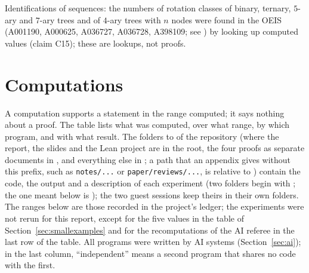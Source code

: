 \documentclass[11pt]{article}
\theoremstyle{definition}
\theoremstyle{remark}
\numberwithin{equation}{section}
\numberwithin{figure}{section}
\begin{document}
\noindent Identifications of sequences: the numbers of rotation classes of binary, ternary, $5$-ary and
$7$-ary trees and of $4$-ary trees with $n$ nodes were found in the OEIS (A001190, A000625, A036727, A036728,
A398109; see \cite{OEISmobiles,OEISA000625}) by looking up computed values (claim C15); these are lookups, not proofs.


\section{Computations}\label{sec:computations}
A computation supports a statement in the range computed; it says nothing about a proof. The table lists
what was computed, over what range, by which program, and with what result. The folders
 to  of the repository
(where the report, the slides and the Lean project are in the root, the four proofs as separate documents in
, and everything else in ; a path that an appendix gives
without this prefix, such as \texttt{notes/...} or \texttt{paper/reviews/...}, is relative to
) contain the code, the output and a
description of each experiment (two folders begin with ; the one meant below is
); the two guest sessions keep theirs in their own folders. The ranges below are
those recorded in the project's ledger; the experiments were not rerun for this report, except for the five
values in the table of Section~\ref{sec:smallexamples} and for the recomputations of the AI referee in the
last row of the table. All programs were written by AI systems
(Section~\ref{sec:ai}); in the last column, ``independent'' means a second program that shares no code with
the first.
\end{document}
